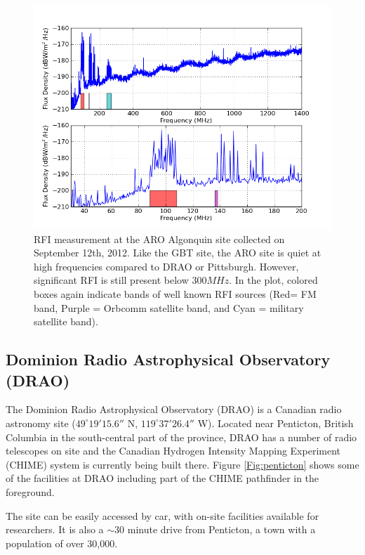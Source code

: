 \begin{figure}[tb]
\begin{center}
\includegraphics[width=0.9\linewidth]{RFI_testing/figures/ALG_bands.png}
\caption{RFI measurement at the ARO Algonquin site collected on September 12th, 2012. Like the GBT site, the ARO site is quiet at high frequencies compared to DRAO or Pittsburgh. However, significant RFI is still present below $300 MHz$. In the plot, colored boxes again indicate bands of well known RFI sources (Red= FM band, Purple = Orbcomm satellite band, and Cyan = military satellite band).}
\label{Fig:arorfi}
\end{center}
\end{figure}


\subsection{Dominion Radio Astrophysical Observatory (DRAO)}

The Dominion Radio Astrophysical Observatory (DRAO) is a Canadian radio astronomy site ($49^\circ 19' 15.6''$ N, $119^\circ 37' 26.4''$ W). Located near Penticton, British Columbia in the south-central part of the province, DRAO has a number of radio telescopes on site and the Canadian Hydrogen Intensity Mapping Experiment (CHIME) system is currently being built there. Figure \ref{Fig:penticton} shows some of the facilities at DRAO including part of the CHIME pathfinder in the foreground. 

The site can be easily accessed by car, with on-site facilities available for researchers. It is also a $\sim$30 minute drive from Penticton, a town with a population of over 30,000. 

